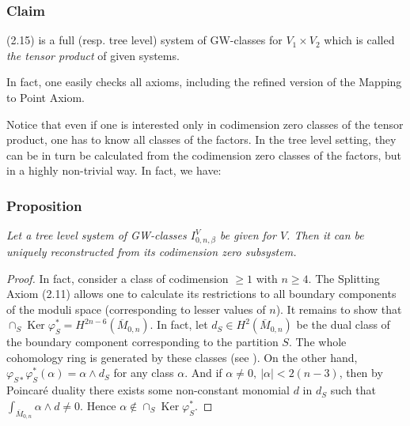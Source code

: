 \documentclass[reqno]{amsart}
\newtheorem{proposition}{Proposition}
\theoremstyle{definition}
\DeclareMathOperator{\Ker}{Ker}
\begin{document}
\medskip

\subsubsection{Claim}
(2.15) is a full (resp. tree level) system
of GW-classes for $V_1\times V_2$ which is called {\it the tensor
product} of given systems.

\medskip

In fact, one easily checks all axioms, including the refined version
of the Mapping to Point Axiom.

\smallskip

Notice that even if one is interested only in codimension zero
classes of the tensor product, one has to know all classes of
the factors. In the tree level setting, they can
be in turn be calculated from the codimension zero classes of the factors,
but in a highly non-trivial way. In fact, we have:

\medskip

\subsubsection{Proposition}
{\it
  Let a tree level system
  of GW-classes $I^V_{0,n,\beta}$ be given for $V$. Then it
  can be uniquely reconstructed from its codimension zero
  subsystem.
}

\smallskip

\begin{proof}
In fact, consider a class of codimension $\ge 1$
with $n\ge 4$. The Splitting Axiom (2.11) allows one to calculate
its restrictions to all boundary components of the moduli
space (corresponding to lesser values of $n$). It remains
to show that $\cap_S \Ker \varphi^*_S=H^{2n-6}({\overline{M}}_{0,n})$.
In fact, let $d_S\in H^2({\overline{M}}_{0,n})$ be the dual
class of the boundary component corresponding to the partition $S$.
The whole cohomology ring is generated by these classes
(see \cite{Ke}).
On the other hand, $\varphi_{S*}\varphi_{S}^*(\alpha )=
\alpha \wedge d_S$ for any class $\alpha $. And if
$\alpha \ne 0,\ |\alpha |< 2(n-3)$, then by Poincar\'e duality
there exists some non-constant monomial $d$ in $d_S$ such that
$\int_{{\overline{M}}_{0,n}}\alpha\wedge d\ne 0$. Hence
$\alpha \notin \cap_S\Ker \varphi^*_S$.
\end{proof}
\end{document}
